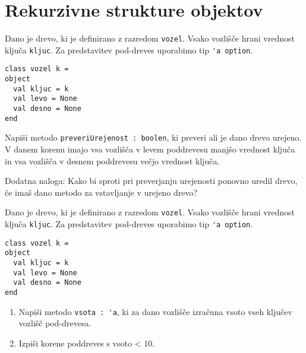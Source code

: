 \section{Rekurzivne strukture objektov}



\begin{ex}
Dano je drevo, ki je definirano z razredom \lstinline{vozel}. Vsako vozli\v s\v ce hrani vrednost klju\v ca \lstinline{kljuc}. Za predstavitev pod-dreves uporabimo tip \lstinline{'a option}.
\begin{lstlisting}
class vozel k = 
object
  val kljuc = k
  val levo = None
  val desno = None
end
\end{lstlisting}

Napi\v si metodo \lstinline{preveriUrejenost : boolen}, ki preveri ali je dano drevo urejeno. V danem korenu imajo vsa vozli\v s\v ca v levem poddrevesu manj\v so vrednost klju\v ca in vsa vozli\v s\v ca v desnem poddrevesu ve\v cjo vrednost klju\v ca.

Dodatna naloga: Kako bi sproti pri preverjanju urejenosti ponovno uredil drevo, \v ce ima\v s dano metodo za vstavljanje v urejeno drevo?
\end{ex}






\begin{ex}
Dano je drevo, ki je definirano z razredom \lstinline{vozel}. Vsako vozli\v s\v ce hrani vrednost klju\v ca \lstinline{kljuc}. Za predstavitev pod-dreves uporabimo tip \lstinline{'a option}.
\begin{lstlisting}
class vozel k = 
object
  val kljuc = k
  val levo = None
  val desno = None
end
\end{lstlisting}

\begin{enumerate}
\item Napi\v si metodo \lstinline{vsota : 'a}, ki za dano vozli\v s\v ce izra\v cuna vsoto vseh klju\v cev vozli\v s\v c pod-drevesa.

\item Izpi\v si korene poddreves s vsoto < 10.
\end{enumerate}
\end{ex}






